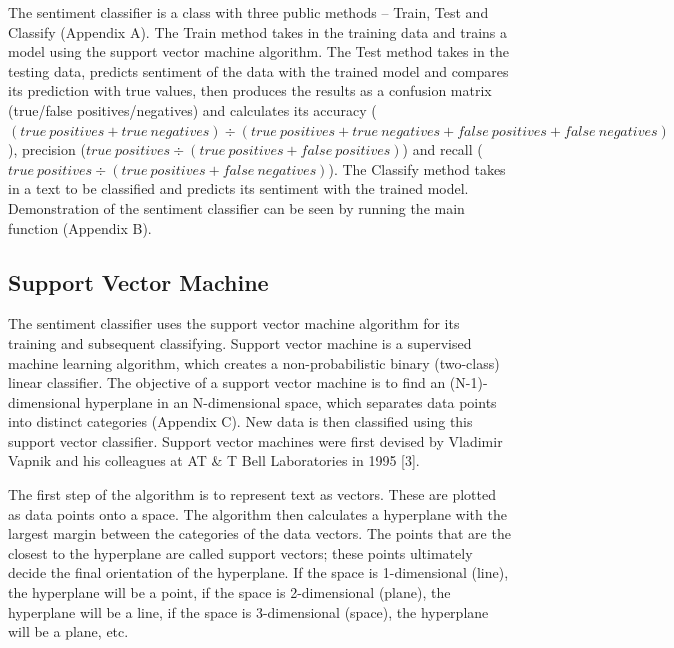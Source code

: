 \documentclass[12pt,journal,compsoc]{IEEEtran}
\begin{document}
The sentiment classifier is a class with three public methods – Train, Test and Classify (Appendix A). The Train method takes in the training data and trains a model using the support vector machine algorithm. The Test method takes in the testing data, predicts sentiment of the data with the trained model and compares its prediction with true values, then produces the results as a confusion matrix (true/false positives/negatives) and calculates its accuracy (\begin{math}(true\ positives + true\ negatives) \div (true\ positives + true\ negatives + false\ positives + false\ negatives)\end{math}), precision (\begin{math}true\ positives \div (true\ positives + false\ positives)\end{math}) and recall (\begin{math}true\ positives \div (true\ positives + false\ negatives)\end{math}). The Classify method takes in a text to be classified and predicts its sentiment with the trained model. Demonstration of the sentiment classifier can be seen by running the main function (Appendix B).

\subsection{Support Vector Machine}
The sentiment classifier uses the support vector machine algorithm for its training and subsequent classifying.
Support vector machine is a supervised machine learning algorithm, which creates a non-probabilistic binary (two-class) linear classifier. The objective of a support vector machine is to find an (N-1)-dimensional hyperplane in an N-dimensional space, which separates data points into distinct categories (Appendix C). New data is then classified using this support vector classifier. Support vector machines were first devised by Vladimir Vapnik and his colleagues at AT \& T Bell Laboratories in 1995 [3].

The first step of the algorithm is to represent text as vectors. These are plotted as data points onto a space. The algorithm then calculates a hyperplane with the largest margin between the categories of the data vectors. The points that are the closest to the hyperplane are called support vectors; these points ultimately decide the final orientation of the hyperplane. If the space is 1-dimensional (line), the hyperplane will be a point, if the space is 2-dimensional (plane), the hyperplane will be a line, if the space is 3-dimensional (space), the hyperplane will be a plane, etc.
\end{document}
